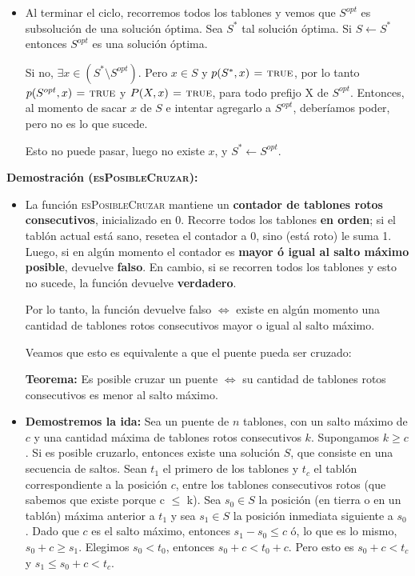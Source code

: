 \begin{itemize}
\begin{itemize}
    \item Al terminar el ciclo, recorremos todos los tablones y vemos que $S^{opt}$ 
    es subsolución de una solución óptima. Sea $S^{*}$ tal solución óptima.
    Si $S \gets S^{*}$ entonces $S^{opt}$ es una solución óptima.
    
    Si no, $\exists x \in (S^{*} \setminus S^{opt})$. Pero $x \in S$ y $p(S^{*}, x) \mathrel{\hspace{1pt}=\hspace{1pt}} \textnormal{\scshape true}$,
    por lo tanto $p(S^{opt}, x) \mathrel{\hspace{1pt}=\hspace{1pt}} \textnormal{\scshape true}$ y $P(X, x) \mathrel{\hspace{1pt}=\hspace{1pt}} \textnormal{\scshape true}$, para todo prefijo
    X de $S^{opt}$. Entonces, al momento de sacar $x$ de $S$ e intentar agregarlo a $S^{opt}$, 
    deberíamos poder, pero no es lo que sucede. 
    
    Esto no puede pasar, luego no existe $x$, y $S^{*} \gets S^{opt}$.

  \end{itemize}

\newpage

\textbf{Demostración (\textsc{esPosibleCruzar}):} 
\begin{itemize}
\item La función \textsc{esPosibleCruzar} mantiene un \textbf{contador de tablones rotos consecutivos},
inicializado en 0. Recorre todos los tablones \textbf{en orden}; si el tablón actual
está sano, resetea el contador a 0, sino (está roto) le suma 1.
Luego, si en algún momento el contador es \textbf{mayor ó igual al salto máximo posible},
devuelve \textbf{falso}. En cambio, si se recorren todos los tablones y esto no sucede, 
la función devuelve \textbf{verdadero}.

Por lo tanto, la función devuelve falso $\iff$ existe en algún momento una
cantidad de tablones rotos consecutivos mayor o igual al salto máximo. 

Veamos que esto es equivalente a que el puente pueda ser cruzado: \medskip

\textbf{Teorema:} Es posible cruzar un puente $\iff$ su cantidad de tablones rotos
consecutivos es menor al salto máximo. \medskip

\item \textbf{Demostremos la ida:}
Sea un puente de $n$ tablones, con un salto máximo de $c$ y una cantidad máxima de
tablones rotos consecutivos $k$.
Supongamos $k \geq c$.
Si es posible cruzarlo, entonces existe una solución $S$, que consiste en una
secuencia de saltos.
Sean $t_1$ el primero de los tablones y $t_c$ el tablón correspondiente a la posición $c$, entre 
los tablones consecutivos rotos (que sabemos que existe porque c $\leq$ k).
Sea $s_0 \in S$ la posición (en tierra o en un tablón) máxima anterior a $t_1$ y sea $s_1 \in S$ 
la posición inmediata siguiente a $s_0$.
Dado que $c$ es el salto máximo, entonces $s_1 - s_0 \leq c$ ó, lo que es lo
mismo, $s_0 + c \geq s_1$.
Elegimos $s_0 < t_0$, entonces $s_0 + c < t_0 + c$.
Pero esto es $s_0 + c < t_c$ y $s_1 \leq s_0 + c < t_c$.


\end{itemize}
\end{itemize}
